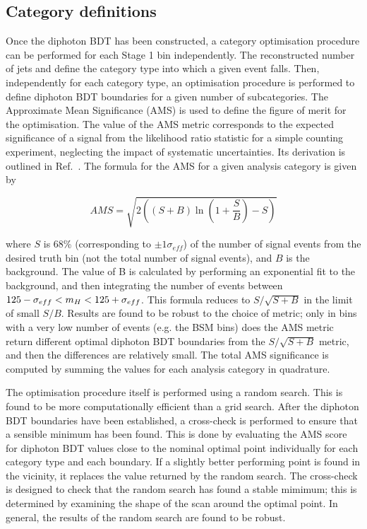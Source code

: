 \subsection{Category definitions}

Once the diphoton BDT has been constructed, 
a category optimisation procedure can be performed for each Stage 1 bin independently.
The reconstructed number of jets and \ptgg define the category type into which a given event falls.
Then, independently for each category type, 
an optimisation procedure is performed to define diphoton BDT boundaries 
for a given number of subcategories.
The Approximate Mean Significance (AMS) is used to define the figure of merit for the optimisation.
The value of the AMS metric corresponds to the expected significance of a signal 
from the likelihood ratio statistic for a simple counting experiment, 
neglecting the impact of systematic uncertainties.
Its derivation is outlined in Ref.~\cite{Asymptotic}.
The formula for the AMS for a given analysis category is given by 

\begin{equation*}
  AMS = \sqrt{ 2 \left( (S+B) \ln{\left(1+\frac{S}{B}\right)} - S \right) }
\end{equation*}

where $S$ is 68\% (corresponding to $\pm 1\sigma_{eff}$) of the number of signal events 
from the desired truth bin (not the total number of signal events), and $B$ is the background.
The value of B is calculated by performing an exponential fit to the background, 
and then integrating the number of events between $125 - \sigma_{eff} < m_{H} < 125 + \sigma_{eff}$.
This formula reduces to $S/\sqrt{S+B}$ in the limit of small $S/B$.
Results are found to be robust to the choice of metric; 
only in bins with a very low number of events (e.g. the BSM bins) 
does the AMS metric return different optimal diphoton BDT boundaries from the $S/\sqrt{S+B}$ metric, 
and then the differences are relatively small.
The total AMS significance is computed by summing the values for each analysis category in quadrature.

The optimisation procedure itself is performed using a random search. 
This is found to be more computationally efficient than a grid search.
After the diphoton BDT boundaries have been established, 
a cross-check is performed to ensure that a sensible minimum has been found.
This is done by evaluating the AMS score for diphoton BDT values 
close to the nominal optimal point individually for each category type and each boundary.
If a slightly better performing point is found in the vicinity, 
it replaces the value returned by the random search.
The cross-check is designed to check that the random search has found a stable mimimum; 
this is determined by examining the shape of the scan around the optimal point.
In general, the results of the random search are found to be robust.

